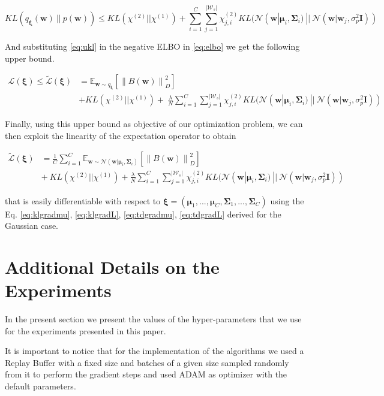 \documentclass{article}
\newcommand{\norm}[1]{\left\lVert #1 \right\rVert}
\begin{document}
\begin{equation}\label{eq:ukl}
KL\left(q_{\bm{\xi}}(\bm{w})\ ||\ p(\bm{w})\right) \leq KL(\chi^{(2)}||\chi^{(1)}) + \sum_{i=1}^C\sum_{j=1}^{|\mathcal{W}_s|} \chi_{j,i}^{(2)}KL(\mathcal{N}(\bm{w}|\bm{\mu}_i, \bm{\Sigma}_i)\ ||\ \mathcal{N}(\bm{w}|\bm{w}_j, \sigma_p^2\bm{I}))
\end{equation}

And substituting \ref{eq:ukl} in the negative ELBO in \ref{eq:elbo} we get the following upper bound.

\begin{align}
\mathcal{L}(\bm{\xi}) \leq  \widetilde{\mathcal{L}}(\bm{\xi}) &= \mathbb{E}_{\bm{w} \sim q_{\bm{\xi}}}\left[\norm{B(\bm{w})}_D^2\right] \nonumber \\&+ KL(\chi^{(2)}||\chi^{(1)}) +\  \frac{\lambda}{N}\sum_{i=1}^C\sum_{j=1}^{|\mathcal{W}_s|} \chi_{j,i}^{(2)}KL(\mathcal{N}(\bm{w}|\bm{\mu}_i, \bm{\Sigma}_i)\ ||\ \mathcal{N}(\bm{w}|\bm{w}_j, \sigma_p^2\bm{I}))
\end{align}

Finally, using this upper bound as objective of our optimization problem, we can then exploit the linearity of the expectation operator to obtain


\begin{align}
\widetilde{\mathcal{L}}(\bm{\xi}) &= \frac{1}{C}\sum_{i=1}^C \mathbb{E}_{\bm{w} \sim \mathcal{N}(\bm{w}|\bm{\mu}_i, \bm{\Sigma}_i)}\left[\norm{B(\bm{w})}_D^2\right] \nonumber \\ &+\ KL(\chi^{(2)}||\chi^{(1)}) + \frac{\lambda}{N}\sum_{i=1}^C\sum_{j=1}^{|\mathcal{W}_s|} \chi_{j,i}^{(2)} KL(\mathcal{N}(\bm{w}|\bm{\mu}_i, \bm{\Sigma}_i)\ ||\ \mathcal{N}(\bm{w}|\bm{w}_j, \sigma_p^2\bm{I}))
\end{align}


that is easily differentiable with respect to $\bm{\xi} = (\bm{\mu}_1,..., \bm{\mu}_C, \bm{\Sigma}_1,..., \bm{\Sigma}_C)$ using the Eq. \ref{eq:klgradmu}, \ref{eq:klgradL}, \ref{eq:tdgradmu}, \ref{eq:tdgradL} derived for the Gaussian case.

\section{Additional Details on the Experiments}

In the present section we present the values of the hyper-parameters that we use for the experiments presented in this paper. 

It is important to notice that for the implementation of the algorithms we used a Replay Buffer with a fixed size and batches of a given size sampled randomly from it to perform the gradient steps and used ADAM as optimizer with the default parameters.
\end{document}
